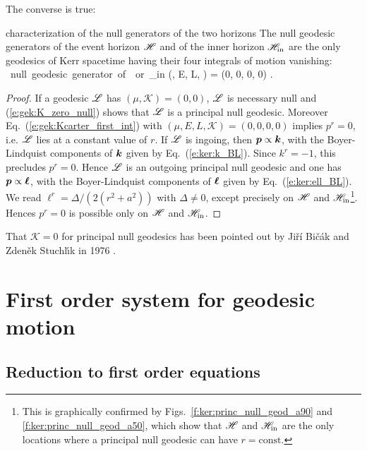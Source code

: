 The converse is true:

\begin{tprop}{characterization of the null generators of the two horizons}{}
The null geodesic generators of the event horizon $\mathscr{H}$ and of the
inner horizon $\mathscr{H}_{\rm in}$ are the only geodesics of Kerr spacetime
having their four integrals of motion vanishing:
\be \label{e:gek:all_const_zero}
\Li \ \mbox{null geodesic generator of}\ \Hor\ \mbox{or}\ \Hor_{\rm in} \iff
(\mu, E, L, ) = (0, 0, 0, 0) .
\ee
\end{tprop}

\begin{proof}
If a geodesic $\mathscr{L}$ has $(\mu,\mathscr{K}) = (0,0)$,
$\mathscr{L}$ is necessary null and (\ref{e:gek:K_zero_null}) shows that
$\mathscr{L}$ is a principal null geodesic. Moreover
Eq.~(\ref{e:gek:Kcarter_first_int}) with $(\mu, E, L, \mathscr{K}) = (0, 0, 0, 0)$
implies $p^r = 0$, i.e. $\mathscr{L}$ lies at a constant value of $r$.
If $\mathscr{L}$ is ingoing, then $\bm{p} \propto \bm{k}$, with the Boyer-Lindquist components
of $\bm{k}$ given by Eq.~(\ref{e:ker:k_BL}). Since $k^r = -1$, this precludes
$p^r = 0$. Hence $\mathscr{L}$ is an outgoing principal null geodesic
and one has $\bm{p} \propto \bm{\ell}$, with the Boyer-Lindquist components
of $\bm{\ell}$ given by Eq.~(\ref{e:ker:ell_BL}). We read $\ell^r = \Delta / (2(r^2+a^2))$
with $\Delta\neq 0$, except precisely on $\mathscr{H}$ and
$\mathscr{H}_{\rm in}$\footnote{This is graphically confirmed by
Figs.~\ref{f:ker:princ_null_geod_a90} and
\ref{f:ker:princ_null_geod_a50}, which show that $\mathscr{H}$ and $\mathscr{H}_{\rm in}$ are the only
locations where a principal null geodesic can have $r=\mathrm{const}$.}. Hences
$p^r = 0$ is possible only on $\mathscr{H}$ and $\mathscr{H}_{\rm in}$.
\end{proof}

\begin{hist}
That $\mathscr{K} = 0$ for principal null geodesics has been pointed out
by Ji\v{r}\'{i} Bi\v{c}\'{a}k and
Zden\v{e}k Stuchl\'{\i}k
in 1976 \cite{BicakS76}.
\end{hist}


\section{First order system for geodesic motion} \label{s:ges:equat_geod_motion}

\subsection{Reduction to first order equations} \label{s:gek:first_order_system}

